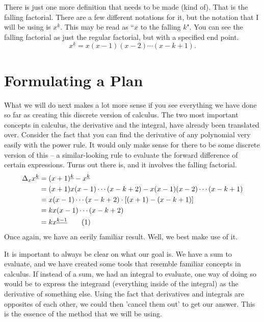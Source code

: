 \documentclass[a4paper]{article}
\theoremstyle{definition}
\begin{document}
There is just one more definition that needs to be made (kind of).
That is the falling factorial.
There are a few different notations for it, but the notation that I will be using is $x^{\underline{k}}$.
This may be read as ``$x$ to the falling $k$".
You can see the falling factorial as just the regular factorial, but with a specified end point.
\begin{equation}
    x^{\underline{k}} = x(x-1)(x-2)\cdots(x-k+1).
\end{equation}

\section{Formulating a Plan}

What we will do next makes a lot more sense if you see everything we have done so far as creating this discrete version of calculus.
The two most important concepts in calculus, the derivative and the integral, have already been translated over.
Consider the fact that you can find the derivative of any polynomial very easily with the power rule.
It would only make sense for there to be some discrete version of this -- a similar-looking rule to evaluate the forward difference of certain expressions.
Turns out there is, and it involves the falling factorial.
\begin{align*}
    \Delta_x x^{\underline{k}} & = (x+1)^{\underline{k}} - x^{\underline{k}}                     \\
                               & = (x+1)x(x-1)\cdots(x-k+2) - x(x-1)(x-2)\cdots(x-k+1)           \\
                               & = x(x-1)\cdots(x-k+2) \cdot [(x+1) - (x-k+1)]                   \\
                               & = kx(x-1)\cdots(x-k+2)                                          \\
                               & = kx^{\underline{k-1}} \stepcounter{equation}\tag{\theequation}
\end{align*}
Once again, we have an eerily familiar result.
Well, we best make use of it.

It is important to always be clear on what our goal is.
We have a sum to evaluate, and we have created some tools that resemble familiar concepts in calculus.
If instead of a sum, we had an integral to evaluate, one way of doing so would be to express the integrand (everything inside of the integral) as the derivative of something else.
Using the fact that derivatives and integrals are opposites of each other, we could then 'cancel them out' to get our answer.
This is the essence of the method that we will be using.
\end{document}
